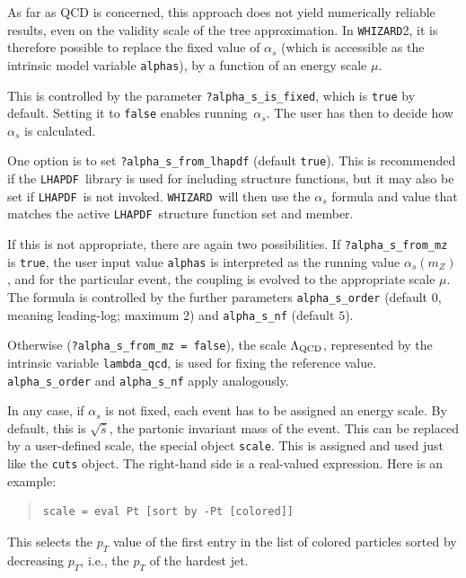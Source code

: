 \documentclass[12pt]{book}
\newcommand{\ttt}[1]{\texttt{#1}}
\newcommand{\whizard}{\texttt{WHIZARD}}
\newcommand{\lhapdf}{\texttt{LHAPDF}}
\begin{document}
As far as QCD is concerned, this approach does not yield numerically
reliable results, even on the validity scale of the tree approximation.
In \whizard 2, it is therefore possible to replace the fixed value of
$\alpha_s$ (which is accessible as the intrinsic model variable
\verb|alphas|), by a function of an energy scale $\mu$.

This is controlled by the parameter \verb|?alpha_s_is_fixed|, which is
\ttt{true} by default.  Setting it to \ttt{false} enables running~$\alpha_s$.
The user has then to decide how $\alpha_s$ is calculated.

One option is to set \verb|?alpha_s_from_lhapdf| (default \ttt{true}).  This
is recommended if the \lhapdf\ library is used for including structure
functions, but it may also be set if \lhapdf\ is not invoked.  \whizard\ will
then use the $\alpha_s$ formula and value that matches the active
\lhapdf\ structure function set and member.

If this is not appropriate, there are again two possibilities.  If
\verb|?alpha_s_from_mz| is \ttt{true}, the user input value \verb|alphas| is
interpreted as the running value $\alpha_s(m_Z)$, and for the particular
event, the coupling is evolved to the appropriate scale $\mu$.  The formula is
controlled by the further parameters \verb|alpha_s_order| (default $0$,
meaning leading-log; maximum $2$) and \verb|alpha_s_nf| (default $5$).

Otherwise (\verb|?alpha_s_from_mz = false|), the scale $\Lambda_{\rm QCD}$,
represented by the intrinsic variable \verb|lambda_qcd|, is used for fixing
the reference value.  \verb|alpha_s_order| and \verb|alpha_s_nf| apply
analogously.

In any case, if $\alpha_s$ is not fixed, each event has to be assigned an
energy scale.  By default, this is $\sqrt{\hat s}$, the partonic invariant
mass of the event.  This can be replaced by a user-defined scale, the special
object \ttt{scale}.  This is assigned and used just like the \ttt{cuts}
object.  The right-hand side is a real-valued expression.  Here is an example:
\begin{quote}
\begin{footnotesize}
\begin{verbatim}
scale = eval Pt [sort by -Pt [colored]]
\end{verbatim}
\end{footnotesize}
\end{quote}
This selects the $p_T$ value of the first entry in the list of colored
particles sorted by decreasing $p_T$, i.e., the $p_T$ of the hardest jet.
\end{document}
